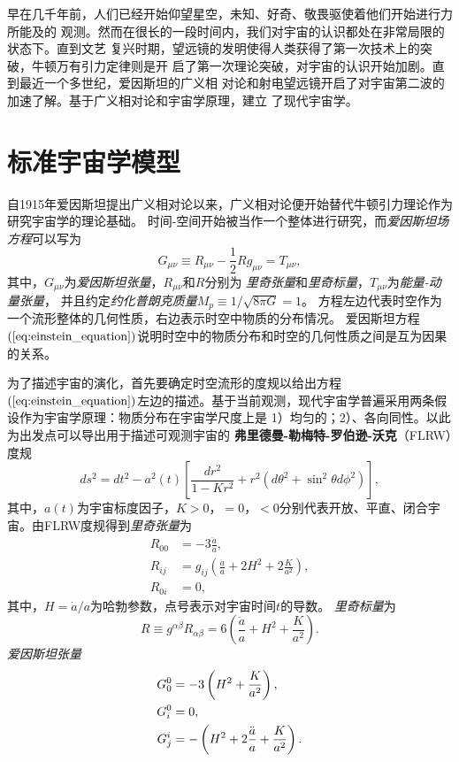 早在几千年前，人们已经开始仰望星空，未知、好奇、敬畏驱使着他们开始进行力所能及的
观测。然而在很长的一段时间内，我们对宇宙的认识都处在非常局限的状态下。直到文艺
复兴时期，望远镜的发明使得人类获得了第一次技术上的突破，牛顿万有引力定律则是开
启了第一次理论突破，对宇宙的认识开始加剧。直到最近一个多世纪，爱因斯坦的广义相
对论和射电望远镜开启了对宇宙第二波的加速了解。基于广义相对论和宇宙学原理，建立
了现代宇宙学。

\section{标准宇宙学模型}
自1915年爱因斯坦提出广义相对论以来，广义相对论便开始替代牛顿引力理论作为研究宇宙学的理论基础。
时间-空间开始被当作一个整体进行研究，而\textit{爱因斯坦场方程}可以写为
\begin{equation}
    \label{eq:einstein_equation}
    G_{\mu\nu}\equiv R_{\mu\nu}-\frac{1}{2}Rg_{\mu\nu}=T_{\mu\nu},
\end{equation}
其中，$G_{\mu\nu}$为\textit{爱因斯坦张量}，$R_{\mu\nu}$和$R$分别为
\textit{里奇张量}和\textit{里奇标量}，$T_{\mu\nu}$为\textit{能量-动量张量}，
并且约定\textit{约化普朗克质量}$M_p\equiv 1 /\sqrt{8\pi G}=1$。
方程左边代表时空作为一个流形整体的几何性质，右边表示时空中物质的分布情况。
爱因斯坦方程$(\ref{eq:einstein_equation})$说明时空中的物质分布和时空的几何性质之间是互为因果的关系。

为了描述宇宙的演化，首先要确定时空流形的度规以给出方程$(\ref{eq:einstein_equation})$左边的描述。基于当前观测，现代宇宙学普遍采用两条假设作为宇宙学原理：物质分布在宇宙学尺度上是
1）均匀的；2）、各向同性。以此为出发点可以导出用于描述可观测宇宙的
\textbf{弗里德曼-勒梅特-罗伯逊-沃克}（FLRW）度规
\begin{equation}\label{eq:frw_metric}
    ds^2=dt^2-a^2(t)\left[\frac{dr^2}{1-Kr^2}+r^2\left(d\theta^2+\sin^2\theta
    d\phi^2\right)\right],
\end{equation}
其中，$a(t)$为宇宙标度因子，$K>0$，$=0$，$<0$分别代表开放、平直、闭合宇宙。由FLRW度规得到\textit{里奇张量}为
\begin{align}
  R_{00} &= -3\frac{\ddot{a}}{a}, \\
  R_{ij} &= g_{ij}\left(\frac{\ddot{a}}{a}+2H^2+2\frac{K}{a^2}\right), \\
  R_{0i} &= 0,
\end{align}
其中，$H=\dot{a} /a$为哈勃参数，点号表示对宇宙时间$t$的导数。
\textit{里奇标量}为
\begin{equation}
    \label{eq:ricci_scalar}
    R \equiv g^{\alpha\beta}R_{\alpha\beta} =
    6\left(\frac{\ddot{a}}{a}+H^2+\frac{K}{a^2}\right).
\end{equation}
\textit{爱因斯坦张量}
\begin{align}
  \label{eq:einstein_tensor}
  G^{0}_0 &= -3\left(H^2+\frac{K}{a^2}\right), \\
  G^{0}_i &= 0, \\
  G^i_j &= -\left(H^2+ 2 \frac{\ddot{a}}{a}+ \frac{K}{a^2}\right).
\end{align}


